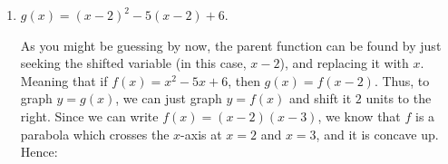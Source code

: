 \documentclass[handout, noauthor, nooutcomes]{ximera}
\begin{document}
\begin{example}
\begin{enumerate}[label=\alph*.]
\begin{explanation}
    \end{explanation}
  \item $g(x) = (x-2)^2 - 5(x-2)+6$. \\[.5em]
    \begin{explanation}
      As you might be guessing by now, the parent function can be found by just seeking the shifted variable (in this case, $x-2$), and replacing it with $x$. Meaning that if $f(x) = x^2-5x+6$, then $g(x) =f(x-2)$. Thus, to graph $y=g(x)$, we can just graph $y=f(x)$ and shift it $2$ units to the right. Since we can write $f(x) = (x-2)(x-3)$, we know that $f$ is a parabola which crosses the $x$-axis at $x=2$ and $x=3$, and it is concave up. Hence:
      \begin{image}
      \end{image}
    \end{explanation}
  \end{enumerate}
\end{example}
%
\end{document}
